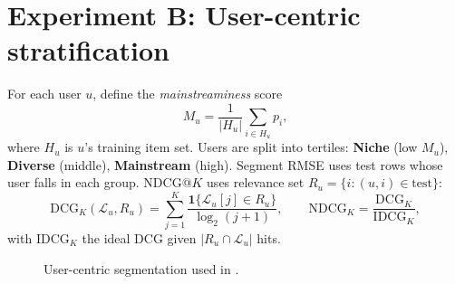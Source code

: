 \documentclass[11pt,a4paper,twoside,openright]{report}
\newcommand{\Ind}[1]{\mathbf{1}\{#1\}}
\newcommand{\file}[1]{\texttt{\detokenize{#1}}}
\begin{document}
\section{Experiment B: User-centric stratification}
For each user $u$, define the \emph{mainstreaminess} score
\begin{equation}
  M_u = \frac{1}{|H_u|} \sum_{i \in H_u} p_i ,
\end{equation}
where $H_u$ is $u$'s training item set. Users are split into tertiles: \textbf{Niche} (low $M_u$), \textbf{Diverse} (middle), \textbf{Mainstream} (high). Segment RMSE uses test rows whose user falls in each group. NDCG@$K$ uses relevance set $R_u = \{ i : (u,i) \in \text{test} \}$:
\begin{equation}
  \mathrm{DCG}_K(\mathcal{L}_u, R_u) = \sum_{j=1}^{K} \frac{\Ind{\mathcal{L}_u[j] \in R_u}}{\log_2(j+1)}, \qquad
  \mathrm{NDCG}_K = \frac{\mathrm{DCG}_K}{\mathrm{IDCG}_K},
\end{equation}
with $\mathrm{IDCG}_K$ the ideal DCG given $|R_u \cap \mathcal{L}_u|$ hits.

\begin{figure}[htbp]
  \centering
  \caption{User-centric segmentation used in \file{run\_user\_centric}.}
  \label{fig:userseg}
\end{figure}
\end{document}
